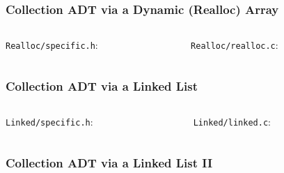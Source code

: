 
\begin{frame}[fragile]
\frametitle{Collection ADT via a Dynamic (Realloc) Array}
\begin{columns}[T]

\begin{column}{0.45\textwidth}
\verb^Realloc/specific.h^:

\end{column}

\pause
\begin{column}{0.45\textwidth}
\verb^Realloc/realloc.c^:

\end{column}

\end{columns}
\end{frame}


\begin{frame}[fragile]
\frametitle{Collection ADT via a Linked List}
\begin{columns}[T]

\begin{column}{0.45\textwidth}
\verb^Linked/specific.h^:

\end{column}

\pause
\begin{column}{0.45\textwidth}
\verb^Linked/linked.c^:

\end{column}

\end{columns}
\end{frame}


\begin{frame}[fragile]
\frametitle{Collection ADT via a Linked List II}
\begin{columns}[T]

\begin{column}{0.45\textwidth}

\end{column}

\pause
\begin{column}{0.45\textwidth}

\end{column}

\end{columns}
\end{frame}

